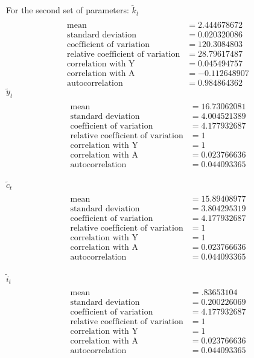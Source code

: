 \documentclass[letterpaper,12pt]{article}
\theoremstyle{definition}
\begin{document}
For the second set of parameters:
$\tilde{k}_t$
\begin{align*}
\\\text{mean} &= 2.444678672
\\\text{standard deviation} &= 	0.020320086
\\\text{coefficient of variation}&=120.3084803
\\\text{relative coefficient of variation}&=28.79617487
\\\text{correlation with Y}&=0.045494757
\\\text{correlation with A}&=-0.112648907
\\\text{autocorrelation}&=0.984864362
\end{align*}
$\tilde{y}_t$
\begin{align*}
\\\text{mean} &= 16.73062081
\\\text{standard deviation} &= 	4.004521389
\\\text{coefficient of variation}&=4.177932687
\\\text{relative coefficient of variation}&=1
\\\text{correlation with Y}&=1
\\\text{correlation with A}&=0.023766636
\\\text{autocorrelation}&=0.044093365
\end{align*}
\\
$\tilde{c}_t$
\begin{align*}
\\\text{mean} &= 15.89408977
\\\text{standard deviation} &= 	3.804295319
\\\text{coefficient of variation}&=4.177932687
\\\text{relative coefficient of variation}&=1
\\\text{correlation with Y}&=1
\\\text{correlation with A}&=0.023766636
\\\text{autocorrelation}&=0.044093365
\end{align*}
\\
$\tilde{i}_t$
\begin{align*}
\\\text{mean} &= .83653104
\\\text{standard deviation} &= 	0.200226069
\\\text{coefficient of variation}&=4.177932687
\\\text{relative coefficient of variation}&=1
\\\text{correlation with Y}&=1
\\\text{correlation with A}&=0.023766636
\\\text{autocorrelation}&=0.044093365
\end{align*}
\end{document}
